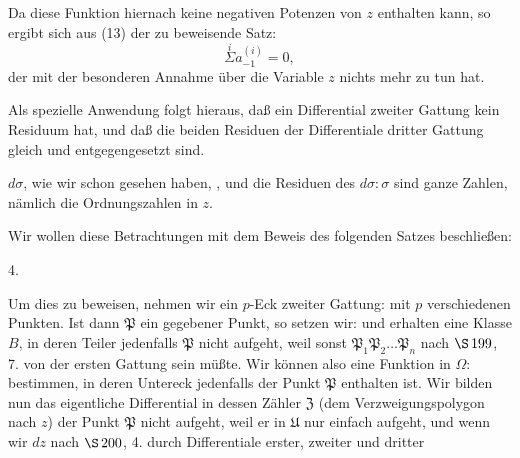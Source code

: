 Da diese Funktion hiernach keine negativen Potenzen von $z$ enthalten kann, so ergibt sich aus (13) der zu beweisende Satz:
\[
\overset{i}{\Sigma} a^{(i)}_{-1} = 0,
\]
der mit der besonderen Annahme über die Variable $z$ nichts mehr zu tun hat.

Als spezielle Anwendung folgt hieraus, daß ein Differential zweiter Gattung kein Residuum hat, und daß die beiden Residuen der Differentiale dritter Gattung gleich und entgegengesetzt sind.

 $d\sigma$, wie wir schon gesehen haben, , und die Residuen des \glqq{}\grqq{} $d\sigma:\sigma$ sind ganze Zahlen, nämlich die Ordnungszahlen in $z$.

Wir wollen diese Betrachtungen mit dem Beweis des folgenden Satzes beschließen:

4. 

Um dies zu beweisen, nehmen wir ein $p$-Eck zweiter Gattung:
mit $p$ verschiedenen Punkten. Ist dann $\mathfrak P$ ein gegebener Punkt, so setzen wir:
und erhalten eine Klasse $B$, in deren Teiler jedenfalls $\mathfrak P$ nicht aufgeht, weil sonst $\mathfrak P_1 \mathfrak P_2 \ldots \mathfrak P_n$
nach $\S\,199$, 7. von der ersten Gattung sein müßte. Wir können also eine Funktion in $\Omega$:
bestimmen, in deren Untereck jedenfalls der Punkt $\mathfrak P$ enthalten ist. Wir bilden nun das eigentliche Differential
in dessen Zähler $\mathfrak Z$ (dem Verzweigungspolygon nach $z$) der Punkt $\mathfrak P$ nicht aufgeht, weil er in $\mathfrak U$ nur einfach aufgeht, und wenn wir $dz$ nach $\S\,200$, 4. durch Differentiale erster, zweiter und dritter
